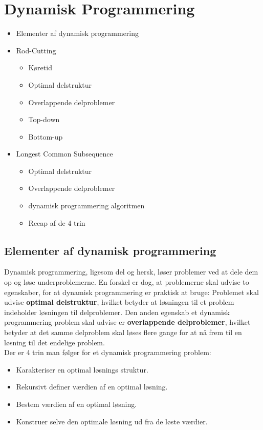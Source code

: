 \section{Dynamisk Programmering}
\hrulefill

\begin{itemize}
\item{Elementer af dynamisk programmering}
\item Rod-Cutting
  \begin{itemize}
  \item Køretid
  \item Optimal delstruktur
  \item Overlappende delproblemer
  \item Top-down
  \item Bottom-up
  \end{itemize}
\item Longest Common Subsequence
  \begin{itemize}
  \item Optimal delstruktur
  \item Overlappende delproblemer
  \item dynamisk programmering algoritmen
  \item Recap af de 4 trin
  \end{itemize}
\end{itemize}

\newpage
\subsection{Elementer af dynamisk programmering}
Dynamisk programmering, ligesom del og hersk, løser problemer ved at dele dem op og løse underproblemerne. En forskel er dog, at problemerne skal udvise to egenskaber, for at dynamisk programmering er praktisk at bruge: Problemet skal udvise \textbf{optimal delstruktur}, hvilket betyder at løsningen til et problem indeholder løsningen til delproblemer. Den anden egenskab et dynamisk programmering problem skal udvise er \textbf{overlappende delproblemer}, hvilket betyder at det samme delproblem skal løses flere gange for at nå frem til en løsning til det endelige problem.\\

Der er 4 trin man følger for et dynamisk programmering problem:
\begin{itemize}
\item Karakteriser en optimal løsnings struktur.
\item Rekursivt definer værdien af en optimal løsning.
\item Bestem værdien af en optimal løsning.
\item Konstruer selve den optimale løsning ud fra de løste værdier.
\end{itemize}

